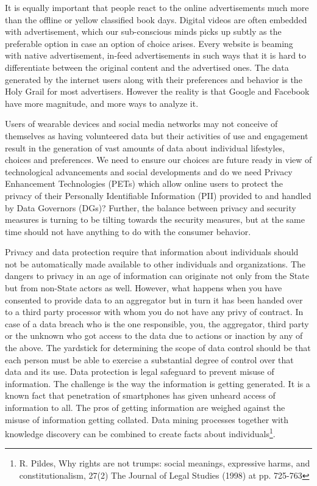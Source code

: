 \begin{multicols}{2}
It is equally important that people react to the online advertisements much more than the offline or yellow classified book days. Digital videos are often embedded with advertisement, which our sub-conscious minds picks up subtly as the preferable option in case an option of choice arises. Every website is beaming with native advertisement, in-feed advertisements in such ways that it is hard to differentiate between the original content and the advertised ones. The data generated by the internet users along with their preferences and behavior is the Holy Grail for most advertisers. However the reality is that Google and Facebook have more magnitude, and more ways to analyze it. 

Users of wearable devices and social media networks may not conceive of themselves as having volunteered data but their activities of use and engagement result in the generation of vast amounts of data about individual lifestyles, choices and preferences. We need to ensure our choices are future ready in view of technological advancements and social developments and do we need Privacy Enhancement Technologies (PETs) which allow online users to protect the privacy of their Personally Identifiable Information (PII) provided to and handled by Data Governors (DGs)? Further, the balance between privacy and security measures is turning to be tilting towards the security measures, but at the same time should not have anything to do with the consumer behavior.

Privacy and data protection require that information about individuals should not be automatically made available to other individuals and organizations. The dangers to privacy in an age of information can originate not only from the State but from non-State actors as well. However, what happens when you have consented to provide data to an aggregator but in turn it has been handed over to a third party processor with whom you do not have any privy of contract. In case of a data breach who is the one responsible, you, the aggregator, third party or the unknown who got access to the data due to actions or inaction by any of the above. The yardstick for determining the scope of data control should be that each person must be able to exercise a substantial degree of control over that data and its use. Data protection is legal safeguard to prevent misuse of information. The challenge is the way the information is getting generated. It is a known fact that penetration of smartphones has given unheard access of information to all. The pros of getting information are weighed against the misuse of information getting collated. Data mining processes together with knowledge discovery can be combined to create facts about individuals\footnote{R. Pildes, Why rights are not trumps: social meanings, expressive harms, and constitutionalism, 27(2) The Journal of Legal Studies (1998) at pp. 725-763}. 


\end{multicols}
